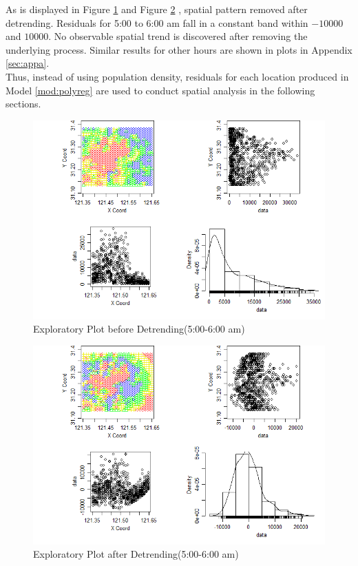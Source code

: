 \documentclass[hidelinks,12pt]{article}
\begin{document}
	As is displayed in Figure \ref{fig:geo5} and Figure \ref{fig:gres5} , spatial pattern removed after detrending. Residuals for 5:00 to 6:00 am fall in a constant band within $-10000$ and  $10000$. No observable spatial trend is discovered after removing the underlying process. Similar results for other hours are shown in plots in Appendix \ref{sec:appa}.\\
	
	Thus, instead of using population density, residuals for each location produced in Model \ref{mod:polyreg} are used to conduct spatial analysis in the following sections.
	
	
	\begin{figure}[!ht]
		\includegraphics[width=\textwidth,height=0.35\textheight]{geo5.png}
		\caption{Exploratory Plot before Detrending(5:00-6:00 am) \label{fig:geo5}}
	\end{figure}
	\FloatBarrier
	
	\begin{figure}[!ht]
		\includegraphics[width=\textwidth,height=0.35\textheight]{gres5.png}
		\caption{Exploratory Plot after Detrending(5:00-6:00 am)\label{fig:gres5}}
	\end{figure}
	\FloatBarrier
	
\end{document}
